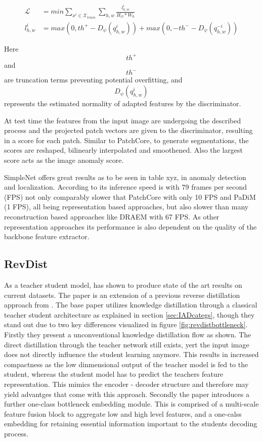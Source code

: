 \begin{equation}
    \label{eq:simplenetloss}
    \begin{split}
        \mathcal{L} &= min \sum_{x^{i}\in \mathcal{X}_{train}} \sum_{h, w} \frac{l^{i}_{h,w}}{H_{O} * W_{0}} \\
        l^{i}_{h,w} &= max(0, th^{+} - D_{\psi}(q^{i}_{h,w})) + max(0, -th^{-} - D_{\psi}(q^{-i}_{h,w}))
    \end{split}
\end{equation}    

Here $$th^{+}$$ and $$th^{-}$$ are truncation terms preventing potential overfitting, and $$D_{\psi}(q^{i}_{h,w})$$ represents the estimated normality of adapted features by the discriminator.

At test time the features from the input image are undergoing the described process and the projected patch vectors are given to the discriminator, resulting in a score for each patch. Similar to 
PatchCore, to generate segmentations, the scores are reshaped, bilinearly interpolated and smoothened. Also the largest score acts as the image anomaly score.

SimpleNet offers great results as to be seen in table xyz, in anomaly detection and localization. According to \cite{liu2023simplenet} its inference speed is with 79 frames per second (FPS) 
not only comparably slower that PatchCore \cite{patchCore2022} with only 10 FPS 
and PaDiM \cite{Defard_2021PADIM} (1 FPS), all being representation based approaches, but also slower than many reconstruction based approaches like DRAEM with 67 FPS. As other representation 
approaches its performance is also dependent on the quality of the backbone feature extractor.


\subsection{RevDist}
\label{subsec:revdist}

As a teacher student model, \cite{revdist2023} has shown to produce state of the art results on current datasets. The paper is an extension of a previous reverse distillation approach from 
\cite{Deng_2022basicrevdist}. The base paper utilizes knowledge distillation through a classical teacher student architecture as explained in section \ref{sec:IADcategs}, though they stand out 
due to two key differences visualized in figure \ref{fig:revdistbottleneck}. Firstly they present a unconventional knowledge distillation flow as shown. The direct distillation through the teacher network still exists, 
yert the input image does not directly influence the student learning anymore. This results in increased compactness as the low dinmensional output of the teacher model is fed to the student, 
whereas the student model has to predict the teachers feature representation. This mimics the encoder - decoder structure and therefore may yield advantges that come with this approach. Secondly 
the paper introduces a further one-class bottleneck embedding module. This is comprised of a multi-scale feature fusion block to aggregate low and high level features, and a one-calss embedding 
for retaining essential information important to the students decoding process. 



